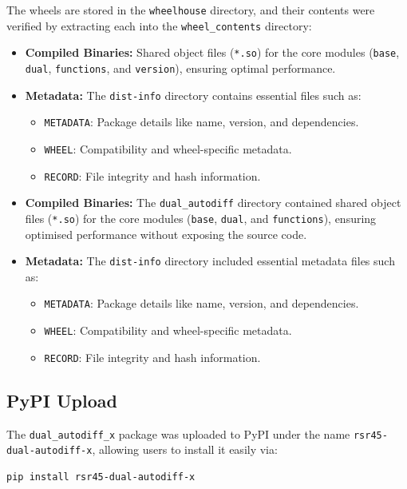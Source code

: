\documentclass[a4paper,12pt]{article}
\begin{document}
The wheels are stored in the \texttt{wheelhouse} directory, and their contents were verified by extracting each into the \texttt{wheel\_contents} directory:
\begin{itemize}
    \item \textbf{Compiled Binaries:} Shared object files (\texttt{*.so}) for the core modules (\texttt{base}, \texttt{dual}, \texttt{functions}, and \texttt{version}), ensuring optimal performance.
    \item \textbf{Metadata:} The \texttt{dist-info} directory contains essential files such as:
    \begin{itemize}
        \item \texttt{METADATA}: Package details like name, version, and dependencies.
        \item \texttt{WHEEL}: Compatibility and wheel-specific metadata.
        \item \texttt{RECORD}: File integrity and hash information.
    \end{itemize}
\end{itemize}

\begin{itemize}
    \item \textbf{Compiled Binaries:} The \texttt{dual\_autodiff} directory contained shared object files (\texttt{*.so}) for the core modules (\texttt{base}, \texttt{dual}, and \texttt{functions}), ensuring optimised performance without exposing the source code.
    \item \textbf{Metadata:} The \texttt{dist-info} directory included essential metadata files such as:
    \begin{itemize}
        \item \texttt{METADATA}: Package details like name, version, and dependencies.
        \item \texttt{WHEEL}: Compatibility and wheel-specific metadata.
        \item \texttt{RECORD}: File integrity and hash information.
    \end{itemize}
\end{itemize}

\subsection{PyPI Upload}

The \texttt{dual\_autodiff\_x} package was uploaded to PyPI under the name \texttt{rsr45-dual-autodiff-x}, allowing users to install it easily via:
\begin{verbatim}
pip install rsr45-dual-autodiff-x
\end{verbatim}
\end{document}
